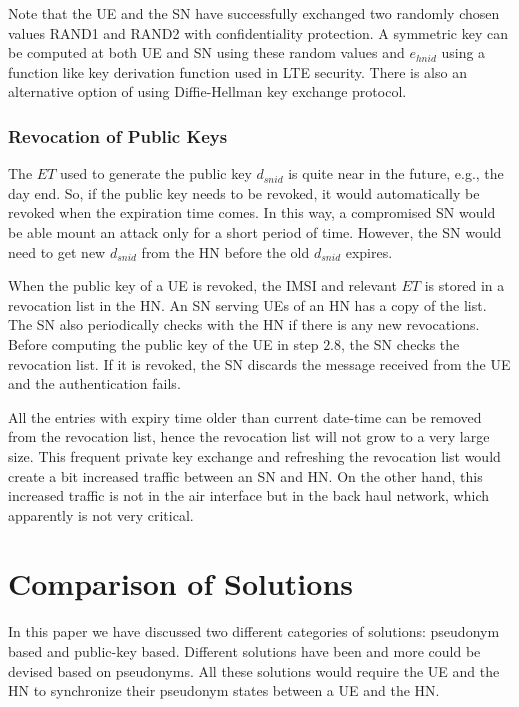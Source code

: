 \documentclass{llncs} %
\begin{document}
Note that the UE and the SN have successfully exchanged two randomly chosen values RAND1 and RAND2 with confidentiality protection. A symmetric key can be computed at both UE and SN using these random values and $e_{hnid}$ using a function like key derivation function used in LTE security. There is also an alternative option of using Diffie-Hellman key exchange protocol. 

\subsubsection{Revocation of Public Keys}
The $ET$ used to generate the public key $d_{snid}$ is quite near in the future, e.g., the day end. So, if the public key needs to be revoked, it would automatically be revoked when the expiration time comes. In this way, a compromised SN would be able mount an attack only for a short period of time. However, the SN would need to get new $d_{snid}$ from the HN before the old $d_{snid}$ expires. 

When the public key of a UE is revoked, the IMSI and relevant $ET$ is stored in a revocation list in the HN.  An SN serving UEs of an HN has a copy of the list. The SN also periodically checks with the HN if there is any new revocations. Before computing the public key of the UE in step $2.8$, the SN checks the revocation list. If it is revoked, the SN discards the message received from the UE and the authentication fails. 

All the entries with expiry time older than current date-time can be removed from the revocation list, hence the revocation list will not grow to a very large size. This frequent private key exchange and refreshing the revocation list would create a bit increased traffic between an SN and HN. On the other hand, this increased traffic is not in the air interface but in the back haul network, which apparently is not very critical. 


\section{Comparison of Solutions}
\label{sec:evaluation}
In this paper we have discussed two different categories of solutions: pseudonym based and public-key based. Different solutions \cite{pseudonym_valtteri_philip,pseudonym_ericsson,CCS15,SSR15} have been and more could be devised based on pseudonyms. All these solutions would require the UE and the HN to synchronize their pseudonym states between a UE and the HN.
\end{document}
